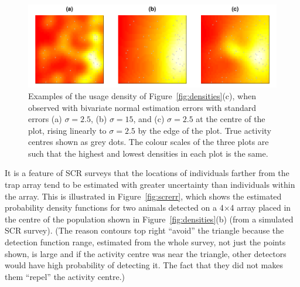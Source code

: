 \documentclass[10pt,a4paper]{article}
\begin{document}
\begin{figure}[htbp]
\centering
\includegraphics[width=\textwidth]{acuseesterr.pdf}
\caption{Examples of the usage density of Figure~\ref{fig:densities}(c), when observed with bivariate normal estimation errors with standard errors (a) $\sigma=2.5$, (b) $\sigma=15$, and (c) $\sigma=2.5$ at the centre of the plot, rising linearly to $\sigma=2.5$ by the edge of the plot. True activity centres shown as grey dots. The colour scales of the three plots are such that the highest and lowest densities in each plot is the same.}
\label{fig:acuseesterr}
\end{figure}

It is a feature of SCR surveys that the locations of individuals farther from the trap array tend to be estimated with greater uncertainty than individuals within the array. This is illustrated in Figure~\ref{fig:screrr}, which shows the estimated probability density functions for two animals detected on a 4$\times$4 array placed in the centre of the population shown in Figure~\ref{fig:densities}(b) (from a simulated SCR survey). (The reason contours top right ``avoid'' the triangle because the detection function range, estimated from the whole survey, not just the points shown, is large and if the activity centre was near the triangle, other detectors would have high probability of detecting it. The fact that they did not makes them ``repel'' the activity centre.) 
\end{document}
